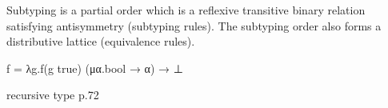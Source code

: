 Subtyping is a partial order which is a reflexive transitive binary relation satisfying antisymmetry (subtyping rules). The subtyping order also forms a distributive lattice (equivalence rules). 

f = λg.f(g true)
(μα.bool → α) → ⊥

recursive type p.72

